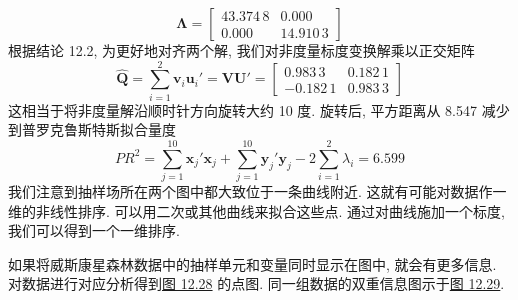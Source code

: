 
\begin{mvfigure}
\label{fig:12.26}
\end{mvfigure}

\[
\boldsymbol{\Lambda}=\begin{bmatrix}43.374\,8&0.000\\0.000&14.910\,3\end{bmatrix}
\]
根据结论 12.2, 为更好地对齐两个解, 我们对非度量标度变换解乘以正交矩阵
\[
\hat{\mathbf{Q}}=\sum_{i=1}^{2}\mathbf{v}_{i}\mathbf{u}_{i}'=\mathbf{V}\mathbf{U}'=\begin{bmatrix}0.983\,3&0.182\,1\\-0.182\,1&0.983\,3\end{bmatrix}
\]
这相当于将非度量解沿顺时针方向旋转大约 10 度. 旋转后, 平方距离从 8.547 减少到普罗克鲁斯特斯拟合量度
\[
PR^{2}=\sum_{j=1}^{10}\mathbf{x}_{j}'\mathbf{x}_{j}+\sum_{j=1}^{10}\mathbf{y}_{j}'\mathbf{y}_{j}-2\sum_{i=1}^{2}\lambda_{i}=6.599
\]
我们注意到抽样场所在两个图中都大致位于一条曲线附近. 这就有可能对数据作一维的非线性排序. 可以用二次或其他曲线来拟合这些点. 通过对曲线施加一个标度, 我们可以得到一个一维排序.

如果将威斯康星森林数据中的抽样单元和变量同时显示在图中, 就会有更多信息. 对数据进行对应分析得到\hyperref[fig:12.28]{图 12.28} 的点图. 同一组数据的双重信息图示于\hyperref[fig:12.29]{图 12.29}.

\begin{mvfigure}
\label{fig:12.28}
\end{mvfigure}

